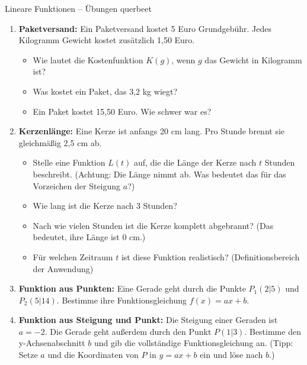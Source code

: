 \begin{aufgabenumgebung}{Lineare Funktionen – Übungen querbeet}
\begin{enumerate}
    \item \textbf{Paketversand:} Ein Paketversand kostet 5 Euro Grundgebühr. Jedes Kilogramm Gewicht kostet zusätzlich 1,50 Euro.
        \begin{itemize}
            \item Wie lautet die Kostenfunktion $K(g)$, wenn $g$ das Gewicht in Kilogramm ist?
            \item Was kostet ein Paket, das 3,2 kg wiegt?
            \item Ein Paket kostet 15,50 Euro. Wie schwer war es?
        \end{itemize}
    \item \textbf{Kerzenlänge:} Eine Kerze ist anfangs 20 cm lang. Pro Stunde brennt sie gleichmäßig 2,5 cm ab.
        \begin{itemize}
            \item Stelle eine Funktion $L(t)$ auf, die die Länge der Kerze nach $t$ Stunden beschreibt. (Achtung: Die Länge nimmt ab. Was bedeutet das für das Vorzeichen der Steigung $a$?)
            \item Wie lang ist die Kerze nach 3 Stunden?
            \item Nach wie vielen Stunden ist die Kerze komplett abgebrannt? (Das bedeutet, ihre Länge ist 0 cm.)
            \item Für welchen Zeitraum $t$ ist diese Funktion realistisch? (Definitionsbereich der Anwendung)
        \end{itemize}
    \item \textbf{Funktion aus Punkten:} Eine Gerade geht durch die Punkte $P_1(2|5)$ und $P_2(5|14)$. Bestimme ihre Funktionsgleichung $f(x)=ax+b$.
    \item \textbf{Funktion aus Steigung und Punkt:} Die Steigung einer Geraden ist $a = -2$. Die Gerade geht außerdem durch den Punkt $P(1|3)$. Bestimme den y-Achsenabschnitt $b$ und gib die vollständige Funktionsgleichung an. (Tipp: Setze $a$ und die Koordinaten von $P$ in $y=ax+b$ ein und löse nach $b$.)
\end{enumerate}
\end{aufgabenumgebung}


